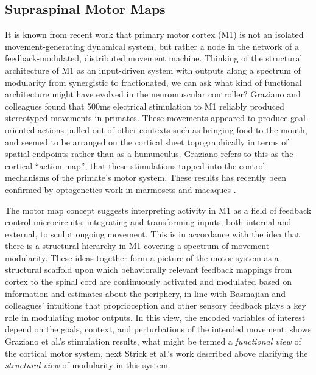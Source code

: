 \documentclass[../main.tex]{subfiles}
\begin{document}
\subsection{Supraspinal Motor Maps}\label{supraspinal-motor-maps}

It is known from recent work that primary motor cortex (M1) is not an isolated movement-generating dynamical system, but rather a node in the network of a feedback-modulated, distributed movement machine\cite{sauerbreiCorticalPatternGeneration2019}. Thinking of the structural architecture of M1 as an input-driven system with outputs along a spectrum of modularity from synergistic to fractionated, we can ask what kind of functional architecture might have evolved in the neuromuscular controller? Graziano and colleagues found that 500ms electrical stimulation to M1 reliably produced stereotyped movements in primates\cite{grazianoOrganizationBehaviorialRepertoire2006}. These movements appeared to produce goal-oriented actions pulled out of other contexts such as bringing food to the mouth, and seemed to be arranged on the cortical sheet topographically in terms of spatial endpoints rather than as a humunculus. Graziano refers to this as the cortical ``action map'', that these stimulations tapped into the control mechanisms of the primate's motor system\cite{grazianoIntelligentMovementMachine2009}. These results has recently been confirmed by optogenetics work in marmosets and macaques \cite{ebinaArmMovementsInduced2019,watanabeForelimbMovementsEvoked2020}.

The motor map concept suggests interpreting activity in M1 as a field of feedback control microcircuits, integrating and transforming inputs, both internal and external, to sculpt ongoing movement\cite{wiltschkoMappingSubSecondStructure2015}. This is in accordance with the idea that there is a structural hierarchy in M1 covering a spectrum of movement modularity. These ideas together form a picture of the motor system as a structural scaffold upon which behaviorally relevant feedback mappings from cortex to the spinal cord are continuously activated and modulated based on information and estimates about the periphery, in line with Basmajian and colleagues' intuitions that proprioception and other sensory feedback plays a key role in modulating motor outputs. In this view, the encoded variables of interest depend on the goals, context, and perturbations of the intended movement.  shows Graziano et al.'s stimulation results, what might be termed a \textit{functional view} of the cortical motor system, next Strick et al.'s work described above clarifying the \textit{structural view} of modularity in this system.
\end{document}
